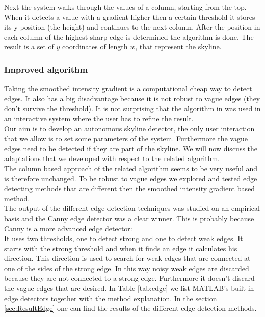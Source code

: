 Next the system walks through the values of a column, starting from the top.
When it detects a value with a gradient higher then a certain threshold it
stores its y-position (the height) and continues to the next column. After the
position in each column of the highest sharp edge is determined the algorithm is
done. The result is a set of $y$ coordinates of length $w$, that represent the
skyline. 

\subsubsection{Improved algorithm}
Taking the smoothed intensity gradient is a computational cheap way to
detect edges. It also has a big disadvantage because it is not robust to vague edges
(they don't survive the threshold). It is not surprising that the algorithm in \cite{Rover}
was used in an interactive system where the user has to refine the result.\\

Our aim is to develop an autonomous skyline detector, the only user interaction
that we allow is to set some parameters of the system. Furthermore the vague
edges need to be detected if they are part of the skyline. We will now discuss
the adaptations that we developed with respect to the related algorithm.\\

The column based approach of the related algorithm seems to be very useful and is
therefore unchanged. To be robust to vague edges we explored and tested
edge detecting methods that are different then the smoothed intensity gradient
based method.\\

\label{sec:edgeDet}
The output of the different edge detection techniques was studied on an empirical
basis and the Canny edge detector \cite{Canny} was a clear winner. This is
probably because Canny is a more advanced edge detector:\\
It uses two thresholds, one to detect strong and one to detect weak edges. 
It starts with the strong threshold and when it finds an edge it calculates his
direction. This direction is used to search for weak edges that are connected
at one of the sides of the strong edge. In this way noisy weak edges are
discarded because they are not connected to a strong edge. Furthermore it
doesn't discard the vague edges that are desired.
In Table \ref{tab:edge} 
we list MATLAB\cite{matlab}'s built-in edge detectors together with the method explanation.  
In the section \ref{sec:ResultEdge} one can find the results of the different
edge detection methods.



